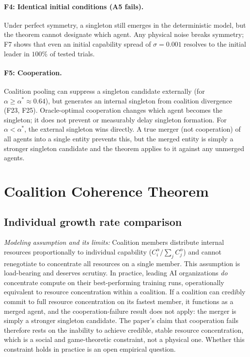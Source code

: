 \documentclass[11pt,letterpaper]{article}
\theoremstyle{plain}
\theoremstyle{definition}
\theoremstyle{remark}
\begin{document}
\paragraph{F4: Identical initial conditions (A5 fails).}
Under perfect symmetry, a singleton still emerges in the deterministic
model, but the theorem cannot designate which agent.
Any physical noise breaks symmetry; F7 shows that even an initial
capability spread of $\sigma = 0.001$ resolves to the initial leader
in $100\%$ of tested trials.

\paragraph{F5: Cooperation.}
Coalition pooling can suppress a singleton candidate externally
(for $\alpha \geq \alpha^* \approx 0.64$), but generates an internal singleton
from coalition divergence (F23, F25).
Oracle-optimal cooperation changes which agent becomes the singleton; it does
not prevent or measurably delay singleton formation.
For $\alpha < \alpha^*$, the external singleton wins directly.
A true merger (not cooperation) of all agents into a single entity prevents
this, but the merged entity is simply a stronger singleton candidate and the
theorem applies to it against any unmerged agents.

\section{Coalition Coherence Theorem}
\label{sec:coalition}

\subsection{Individual growth rate comparison}
\label{sec:coalitionindiv}

\textit{Modeling assumption and its limits:}
Coalition members distribute internal resources proportionally to individual
capability ($C_i^\alpha / \sum_j C_j^\alpha$) and cannot renegotiate to
concentrate all resources on a single member.
This assumption is load-bearing and deserves scrutiny.
In practice, leading AI organizations \emph{do} concentrate compute on
their best-performing training runs, operationally equivalent to resource
concentration within a coalition.
If a coalition can credibly commit to full resource concentration on its
fastest member, it functions as a merged agent, and the cooperation-failure
result does not apply: the merger is simply a stronger singleton candidate.
The paper's claim that cooperation fails therefore rests on the inability
to achieve credible, stable resource concentration, which is a social and
game-theoretic constraint, not a physical one.
Whether this constraint holds in practice is an open empirical question.
\end{document}
